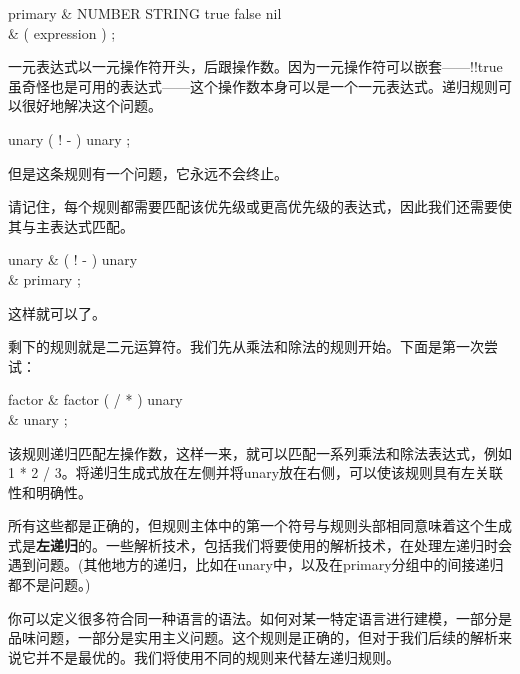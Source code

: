 \documentclass[cn,11pt,chinese]{elegantbook}
\begin{document}
\begin{ebnf}
primary & \rightarrow \quad NUMBER \quad\vert\quad STRING \quad\vert\quad {}true \quad\vert\quad {}false \quad\vert\quad {}nil \\
        & \;\;\vert\quad {}( expression ) \quad ;
\end{ebnf}

一元表达式以一元操作符开头，后跟操作数。因为一元操作符可以嵌套——!!true虽奇怪也是可用的表达式——这个操作数本身可以是一个一元表达式。递归规则可以很好地解决这个问题。

\begin{ebnf}
unary \rightarrow \quad ( \quad {}! \quad\vert\quad {}- \quad ) \quad unary \quad ;
\end{ebnf}

但是这条规则有一个问题，它永远不会终止。

请记住，每个规则都需要匹配该优先级或更高优先级的表达式，因此我们还需要使其与主表达式匹配。

\begin{ebnf}
unary & \rightarrow \quad ( \quad {}! \quad\vert\quad {}- \quad ) \quad unary \\
      & \;\;\vert \quad primary \quad ;
\end{ebnf}

这样就可以了。

剩下的规则就是二元运算符。我们先从乘法和除法的规则开始。下面是第一次尝试：

\begin{ebnf}
factor & \rightarrow \quad factor \quad ( \quad {}/ \quad\vert\quad {}* \quad ) \quad unary \\
       & \;\;\vert\quad unary \quad ;
\end{ebnf}

该规则递归匹配左操作数，这样一来，就可以匹配一系列乘法和除法表达式，例如1 * 2 / 3。将递归生成式放在左侧并将unary放在右侧，可以使该规则具有左关联性和明确性。

所有这些都是正确的，但规则主体中的第一个符号与规则头部相同意味着这个生成式是\textbf{左递归}的。一些解析技术，包括我们将要使用的解析技术，在处理左递归时会遇到问题。(其他地方的递归，比如在unary中，以及在primary分组中的间接递归都不是问题。)

你可以定义很多符合同一种语言的语法。如何对某一特定语言进行建模，一部分是品味问题，一部分是实用主义问题。这个规则是正确的，但对于我们后续的解析来说它并不是最优的。我们将使用不同的规则来代替左递归规则。
\end{document}
